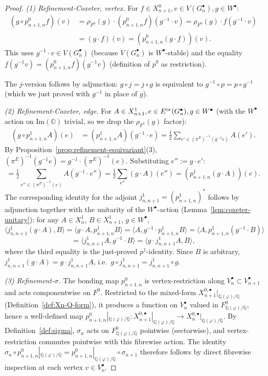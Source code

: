 \documentclass[11pt, a4paper]{amsart}
\theoremstyle{definition}
\newcommand{\Q}{\mathbb{Q}}
\newcommand{\OO}{\mathbb{O}}
\renewcommand{\Im}{\mathrm{Im}}
\begin{document}
\begin{proof}
\emph{(1) Refinement-Coxeter, vertex.} For $f \in X_{n+1}^0,
v \in V(G_n^\bullet), g \in W^\bullet$:
\begin{align*}
  (g \circ p_{n+1, n}^0 f)(v)
  &= \rho_{F^0}(g) \cdot (p_{n+1, n}^0 f)(g^{-1} \cdot v)
  = \rho_{F^0}(g) \cdot f(g^{-1} \cdot v) \\
  &= (g \cdot f)(v) = (p_{n+1, n}^0 (g \cdot f))(v).
\end{align*}
This uses $g^{-1} \cdot v \in V(G_n^\bullet)$ (because $V(G_n^
\bullet)$ is $W^\bullet$-stable) and the equality $f(g^{-1} v) =
(p_{n+1, n}^0 f)(g^{-1} v)$ (definition of $p^0$ as restriction).

The $j$-version follows by adjunction: $g \circ j = j \circ g$ is
equivalent to $g^{-1} \circ p = p \circ g^{-1}$ (which we just
proved with $g^{-1}$ in place of $g$).

\emph{(2) Refinement-Coxeter, edge.} For $A \in X_{n+1}^1,
e \in E^{\rm or}(G_n^\bullet), g \in W^\bullet$ (with the $W^\bullet$
action on $\Im(\OO)$ trivial, so we drop the $\rho_{F^1}(g)$ factor):
\begin{align*}
  (g \circ p_{n+1, n}^1 A)(e)
  &= (p_{n+1, n}^1 A)(g^{-1} \cdot e)
  = \tfrac{1}{2} \sum_{e' \in (\pi^E)^{-1}(g^{-1} e)} A(e').
\end{align*}
By Proposition~\ref{prop:refinement-equivariant}(3),
$(\pi^E)^{-1}(g^{-1} e) = g^{-1} \cdot (\pi^E)^{-1}(e)$.
Substituting $e'' := g \cdot e'$:
\[
  = \tfrac{1}{2} \sum_{e'' \in (\pi^E)^{-1}(e)}
    A(g^{-1} \cdot e'') = \tfrac{1}{2} \sum_{e''} (g \cdot A)(e'')
  = (p_{n+1, n}^1 (g \cdot A))(e).
\]
The corresponding identity for the adjoint $j_{n, n+1}^1
= (p_{n+1, n}^1)^*$ follows by adjunction together with the
unitarity of the $W^\bullet$-action (Lemma~\ref{lem:coxeter-unitary}):
for any $A \in X_n^1$, $B \in X_{n+1}^1$, $g \in W^\bullet$,
\[
  \langle j_{n, n+1}^1 (g \cdot A), B \rangle
  = \langle g \cdot A, p_{n+1, n}^1 B \rangle
  = \langle A, g^{-1} \cdot p_{n+1, n}^1 B \rangle
  = \langle A, p_{n+1, n}^1 (g^{-1} \cdot B) \rangle
\]
\[
  = \langle j_{n, n+1}^1 A, g^{-1} \cdot B \rangle
  = \langle g \cdot j_{n, n+1}^1 A, B \rangle,
\]
where the third equality is the just-proved $p^1$-identity.
Since $B$ is arbitrary, $j_{n, n+1}^1 (g \cdot A)
= g \cdot j_{n, n+1}^1 A$, i.e.\ $g \circ j_{n, n+1}^1
= j_{n, n+1}^1 \circ g$.

\emph{(3) Refinement-$\sigma$.} The bonding map $p_{n+1, n}^0$
is vertex-restriction along $V_n^\bullet \subset V_{n+1}^\bullet$
and acts componentwise on $F^0$. Restricted to the mixed-form
$X_{n+1}^{0, \bullet}|_{\Q(\varphi)/\Q}$ (Definition~\ref{def:Xn-Q-form}),
it produces a function on $V_n^\bullet$ valued in
$F^0_{\Q(\varphi)/\Q}$, hence a well-defined map
$p_{n+1, n}^0|_{\Q(\varphi)/\Q} \colon
X_{n+1}^{0, \bullet}|_{\Q(\varphi)/\Q} \to
X_n^{0, \bullet}|_{\Q(\varphi)/\Q}$. By Definition~\ref{def:sigma},
$\sigma_n$ acts on $F^0_{\Q(\varphi)/\Q}$ pointwise (sectorwise),
and vertex-restriction commutes pointwise with this fibrewise
action. The identity $\sigma_n \circ p_{n+1, n}^0|_{\Q(\varphi)/\Q}
= p_{n+1, n}^0|_{\Q(\varphi)/\Q} \circ \sigma_{n+1}$ therefore
follows by direct fibrewise inspection at each vertex
$v \in V_n^\bullet$.


\end{proof}
\end{document}
